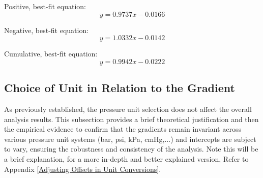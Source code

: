\documentclass{article}
\begin{document}
\begin{center}
	\hspace*{-2em}
	\begin{minipage}{1.1\textwidth}
		\begin{minipage}{0.3\textwidth}	\centering
			Positive, best-fit equation: 
			\[y = 0.9737x-0.0166\]
		\end{minipage}\hfill
		\begin{minipage}{0.3\textwidth}	\centering
			Negative, best-fit equation: 
			\[y = 1.0332x-0.0142\]
		\end{minipage}\hfill
		\begin{minipage}{0.3\textwidth}	\centering
			Cumulative, best-fit equation: 
			\[y = 0.9942x-0.0222\]
		\end{minipage}
	\end{minipage}
\end{center}
	
\subsection{Choice of Unit in Relation to the Gradient}\label{consistency}
As previously established, the pressure unit selection does not affect the overall analysis results. This subsection provides a brief theoretical justification and then the empirical evidence to confirm that the gradients remain invariant across various pressure unit systems (bar, psi, kPa, cmHg,...) and intercepts are subject to vary, ensuring the robustness and consistency of the analysis. Note this will be a {brief explanation}, for a more in-depth and better explained version, Refer to Appendix \ref{Adjusting Offsets in Unit Conversions}.\vspace{-1em}
\end{document}
